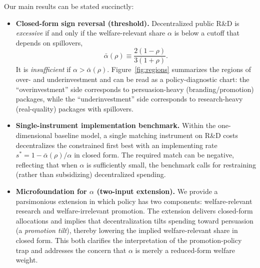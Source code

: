 \documentclass[sn-mathphys-ay]{sn-jnl} %
\theoremstyle{remark}
\begin{document}
Our main results can be stated succinctly:
\begin{itemize}
\item \textbf{Closed-form sign reversal (threshold).}  Decentralized public R\&D is \emph{excessive} if and only if the welfare-relevant share $\alpha$ is below a cutoff that depends on spillovers,
\begin{equation}\label{eq:baralpha}
\bar\alpha(\rho)\equiv \frac{2(1-\rho)}{3(1+\rho)}.
\end{equation}
It is \emph{insufficient} if $\alpha>\bar\alpha(\rho)$. Figure~\ref{fig:regions} summarizes the regions of over- and underinvestment and can be read as a policy-diagnostic chart: the ``overinvestment'' side corresponds to persuasion-heavy (branding/promotion) packages, while the ``underinvestment'' side corresponds to research-heavy (real-quality) packages with spillovers.
\item \textbf{Single-instrument implementation benchmark.} Within the one-dimensional baseline model, a single matching instrument on R\&D costs decentralizes the constrained first best with an implementing rate $s^{*}=1-\bar\alpha(\rho)/\alpha$ in closed form. The required match can be negative, reflecting that when $\alpha$ is sufficiently small, the benchmark calls for restraining (rather than subsidizing) decentralized spending.
\item \textbf{Microfoundation for $\alpha$ (two-input extension).}  We provide a parsimonious extension in which policy has two components: welfare-relevant research and welfare-irrelevant promotion. The extension delivers closed-form allocations and implies that decentralization tilts spending toward persuasion (a \emph{promotion tilt}), thereby lowering the implied welfare-relevant share in closed form. This both clarifies the interpretation of the promotion-policy trap and addresses the concern that $\alpha$ is merely a reduced-form welfare weight.
\end{itemize}
\end{document}
